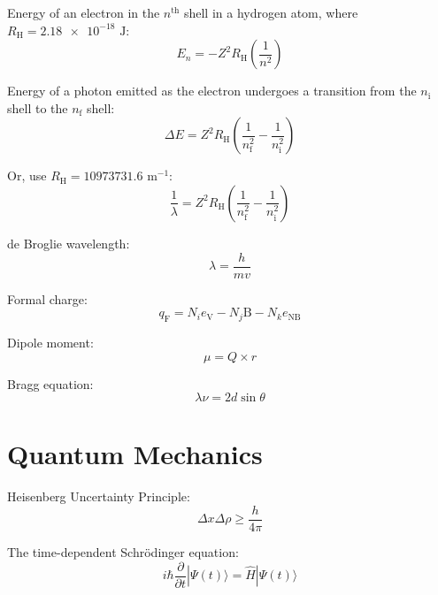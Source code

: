 \documentclass[10pt]{article}
\newcommand*\unit[1]{\textrm{ #1}}
\begin{document}
Energy of an electron in the $n^{\textrm{th}}$ shell in a hydrogen atom, where $R_\textrm{H}=\num{2.18e-18}\unit{J}$:
\begin{equation*}
E_n=-Z^2R_\textrm{H}\left(\frac{1}{n^2}\right)
\end{equation*}

Energy of a photon emitted as the electron undergoes a transition from the $n_\textrm{i}$ shell to the $n_\textrm{f}$ shell:
\begin{equation*}
\Delta E = Z^2R_\textrm{H}\left(\frac{1}{n_\textrm{f}^2}-\frac{1}{n_\textrm{i}^2}\right)
\end{equation*}

Or, use $R_\textrm{H} = 10973731.6$ m$^{-1}$:
\begin{equation*}
\frac{1}{\lambda} = Z^2R_\textrm{H}\left(\frac{1}{n_\textrm{f}^2}-\frac{1}{n_\textrm{i}^2}\right)
\end{equation*}

de Broglie wavelength:
\begin{equation*}
\lambda=\frac{h}{mv}
\end{equation*}

Formal charge:
\begin{equation*}
q_\textrm{F} = N_ie_\textrm{V} - N_j\textrm{B} - N_ke_\textrm{NB} 
\end{equation*}

Dipole moment:
\begin{equation*}
\mu = Q\times r
\end{equation*}

Bragg equation:
\begin{equation*}
\lambda\nu = 2d \sin \theta
\end{equation*}

\newpage
\section{Quantum Mechanics}

Heisenberg Uncertainty Principle:
\begin{equation*}
\Delta x \Delta\rho \ge \frac{h}{4\pi}
\end{equation*}

The time-dependent Schr\"odinger equation:
\begin{equation*}
i\hbar\frac{\partial}{\partial t}|\Psi(t)\rangle = \hat{H}|\Psi(t)\rangle
\end{equation*}
\end{document}
